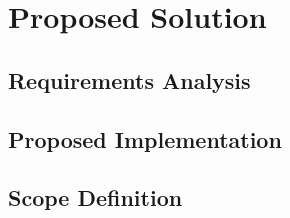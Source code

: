 \chapter{Proposed Solution}
\label{cha:proposed_solution}

\section{Requirements Analysis}
\label{sec:requirements_analysis}

\section{Proposed Implementation}
\label{sec:proposed_implementation}

\section{Scope Definition}
\label{sec:scope_definition}